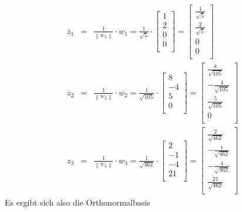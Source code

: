 \documentclass{report}
\begin{document}
				\begin{eqnarray*}
					z_1 &=& \frac{1}{\left\lVert w_1 \right\rVert} \cdot w_1 = \frac1{\sqrt{5}} \cdot \begin{bmatrix} 1 \\ 2 \\ 0 \\ 0 \\ \end{bmatrix} = \begin{bmatrix} \frac1{\sqrt{5}} \\ \frac2{\sqrt{5}} \\ 0 \\ 0 \\ \end{bmatrix} \\
					z_2 &=& \frac{1}{\left\lVert w_2 \right\rVert} \cdot w_2 = \frac1{\sqrt{105}} \cdot \begin{bmatrix} 8 \\ -4 \\ 5 \\ 0 \\ \end{bmatrix} = \begin{bmatrix} \frac8{\sqrt{105}} \\ -\frac4{\sqrt{105}} \\ \frac5{\sqrt{105}} \\ 0 \\ \end{bmatrix} \\
					z_3 &=& \frac{1}{\left\lVert w_3 \right\rVert} \cdot w_3 = \frac1{\sqrt{462}} \cdot \begin{bmatrix} 2 \\ -1 \\ -4 \\ 21 \\ \end{bmatrix} = \begin{bmatrix} \frac2{\sqrt{462}} \\ -\frac1{\sqrt{462}} \\ -\frac4{\sqrt{462}} \\ \frac{21}{\sqrt{462}} \\ \end{bmatrix}
				\end{eqnarray*}
				Es ergibt sich also die Orthonormalbasis
\end{document}
